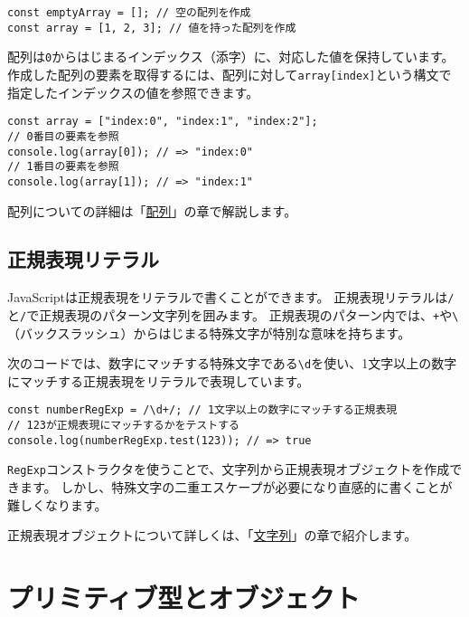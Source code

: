 \begin{lstlisting}
const emptyArray = []; // 空の配列を作成
const array = [1, 2, 3]; // 値を持った配列を作成
\end{lstlisting}

配列は\texttt{0}からはじまるインデックス（添字）に、対応した値を保持しています。
作成した配列の要素を取得するには、配列に対して\texttt{array[index]}という構文で指定したインデックスの値を参照できます。

\begin{lstlisting}
const array = ["index:0", "index:1", "index:2"];
// 0番目の要素を参照
console.log(array[0]); // => "index:0"
// 1番目の要素を参照
console.log(array[1]); // => "index:1"
\end{lstlisting}

配列についての詳細は「\hyperlink{array}{配列}」の章で解説します。

\hypertarget{regexp-literal}{%
\subsection{正規表現リテラル}\label{regexp-literal}}

JavaScriptは正規表現をリテラルで書くことができます。
正規表現リテラルは\texttt{/}と\texttt{/}で正規表現のパターン文字列を囲みます。
正規表現のパターン内では、\texttt{+}や\texttt{\textbackslash}（バックスラッシュ）からはじまる特殊文字が特別な意味を持ちます。

次のコードでは、数字にマッチする特殊文字である\texttt{\textbackslash d}を使い、1文字以上の数字にマッチする正規表現をリテラルで表現しています。

\begin{lstlisting}
const numberRegExp = /\d+/; // 1文字以上の数字にマッチする正規表現
// 123が正規表現にマッチするかをテストする
console.log(numberRegExp.test(123)); // => true
\end{lstlisting}

\texttt{RegExp}コンストラクタを使うことで、文字列から正規表現オブジェクトを作成できます。
しかし、特殊文字の二重エスケープが必要になり直感的に書くことが難しくなります。

正規表現オブジェクトについて詳しくは、「\hyperlink{string}{文字列}」の章で紹介します。

\hypertarget{primitive-and-wrapper-object}{%
\section{プリミティブ型とオブジェクト}\label{primitive-and-wrapper-object}}

